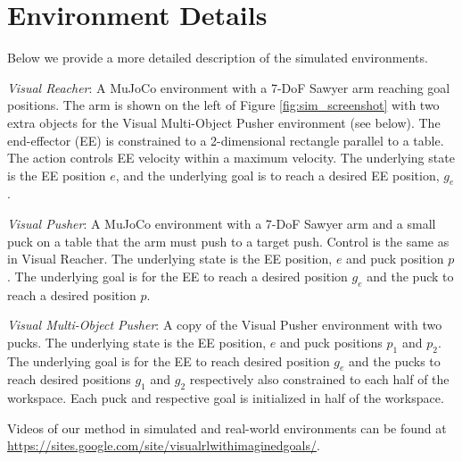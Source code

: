 \section{Environment Details}
Below we provide a more detailed description of the simulated environments.

\textit{Visual Reacher}: A MuJoCo environment with a 7-DoF Sawyer arm reaching goal positions.
The arm is shown on the left of Figure \ref{fig:sim_screenshot} with two extra objects for the Visual Multi-Object Pusher environment (see below).
The end-effector (EE) is constrained to a 2-dimensional rectangle parallel to a table. 
The action controls EE velocity within a maximum velocity. 
The underlying state is the EE position $e$, and the underlying goal is to reach a desired EE position, $g_e$. 

\textit{Visual Pusher}: A MuJoCo environment with a 7-DoF Sawyer arm and a small puck on a table that the arm must push to a target push.
Control is the same as in Visual Reacher.
The underlying state is the EE position, $e$ and puck position $p$.
The underlying goal is for the EE to reach a desired position $g_e$ and the puck to reach a desired position $p$. 

\textit{Visual Multi-Object Pusher}: A copy of the Visual Pusher environment with two pucks.
The underlying state is the EE position, $e$ and puck positions $p_1$ and $p_2$.
The underlying goal is for the EE to reach desired position $g_e$ and the pucks to reach desired positions $g_1$ and $g_2$ respectively also constrained to each half of the workspace.
Each puck and respective goal is initialized in half of the workspace.

Videos of our method in simulated and real-world environments can be found at \url{https://sites.google.com/site/visualrlwithimaginedgoals/}.